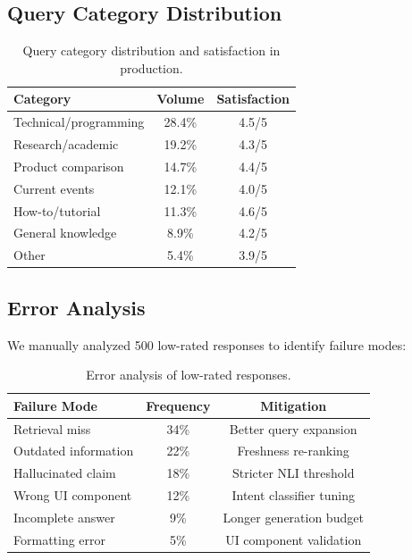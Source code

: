 \subsection{Query Category Distribution}

\begin{table}[H]
\centering
\small
\begin{tabular}{lcc}
\toprule
\textbf{Category} & \textbf{Volume} & \textbf{Satisfaction} \\
\midrule
Technical/programming & 28.4\% & 4.5/5 \\
Research/academic & 19.2\% & 4.3/5 \\
Product comparison & 14.7\% & 4.4/5 \\
Current events & 12.1\% & 4.0/5 \\
How-to/tutorial & 11.3\% & 4.6/5 \\
General knowledge & 8.9\% & 4.2/5 \\
Other & 5.4\% & 3.9/5 \\
\bottomrule
\end{tabular}
\caption{Query category distribution and satisfaction in production.}
\label{tab:query_dist}
\end{table}

\subsection{Error Analysis}

We manually analyzed 500 low-rated responses to identify failure modes:

\begin{table}[H]
\centering
\small
\begin{tabular}{lcc}
\toprule
\textbf{Failure Mode} & \textbf{Frequency} & \textbf{Mitigation} \\
\midrule
Retrieval miss & 34\% & Better query expansion \\
Outdated information & 22\% & Freshness re-ranking \\
Hallucinated claim & 18\% & Stricter NLI threshold \\
Wrong UI component & 12\% & Intent classifier tuning \\
Incomplete answer & 9\% & Longer generation budget \\
Formatting error & 5\% & UI component validation \\
\bottomrule
\end{tabular}
\caption{Error analysis of low-rated responses.}
\label{tab:errors}
\end{table}

